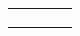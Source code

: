 \begin{table}[!ht]
\begin{tabularx}{\textwidth}{|p{3cm}|K{4cm}|K{3cm}|K{4cm}|}
		&                                                                    &                                                         &                                                                                                                                                                   \\ \hline
		&                                                                    &                                                         &                                                                                                                                                                   \\ \hline
		&                                                                    &                                                         &                                                                                                                                                                   \\ \hline
		&                                                                    &                                                         &                                                                                                                                                                   \\ \hline
	\end{tabularx}
\end{table}




